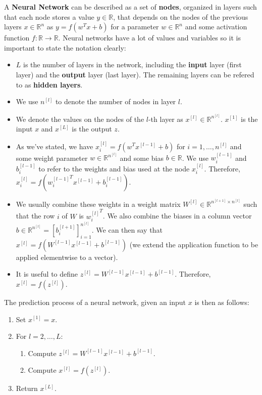 \documentclass{article}
\newcommand{\R}{\mathbb{R}}
\begin{document}
A \textbf{Neural Network} can be described as a set of \textbf{nodes}, organized in layers such that each node stores a value $y \in \R$, that depends on the nodes of the previous layers $x \in \R^n$ as $y = f(w^T x + b)$ for a parameter $w \in \R^n$ and some activation function $f: \R \to \R$.
Neural networks have a lot of values and variables so it is important to state the notation clearly:
\begin{itemize}
\item $L$ is the number of layers in the network, including the \textbf{input} layer (first layer) and the \textbf{output} layer (last layer). The remaining layers can be refered to as \textbf{hidden layers}.
\item We use $n^{[l]}$ to denote the number of nodes in layer $l$.
\item We denote the values on the nodes of the $l$-th layer as $x^{[l]} \in \R^{n^{[l]}}$. $x^{[1]}$ is the input $x$ and $x^{[L]}$ is the output $z$. 
\item As we've stated, we have $x^{[l]}_i = f(w^T x^{[l-1]} + b)$ for $i = 1, \dots, n^{[l]}$ and some weight parameter $w \in \R^{n^{[l]}}$ and some bias $b \in \R$. We use $w^{[l-1]}_i$ and $b^{[l-1]}_i$ to refer to the weights and bias used at the node $x^{[l]}_i$. Therefore, $x^{[l]}_i = f({w^{[l-1]}_i}^T x^{[l-1]} + b^{[l-1]}_i)$. 
\item We usually combine these weights in a weight matrix $W^{[l]} \in \R^{n^{[l+1]} \times n^{[l]}}$ such that the row $i$ of $W$ is ${w^{[l]}_i}^T$. We also combine the biases in a column vector $b \in \R^{n^{[l]}} = [b^{[l+1]}_i]_{i=1}^{n^{[l]}}$. We can then say that $x^{[l]} = f(W^{[l-1]}x^{[l-1]} + b^{[l-1]})$ (we extend the application function to be applied elementwise to a vector).
\item It is useful to define $z^{[l]} = W^{[l-1]}x^{[l-1]} + b^{[l-1]}$. Therefore, $x^{[l]} = f(z^{[l]})$.
\end{itemize}

The prediction process of a neural network, given an input $x$ is then as follows:
\begin{enumerate}
\item Set $x^{[1]} = x$.
\item For $l = 2, \dots, L$:
\begin{enumerate}
\item Compute $z^{[l]} = W^{[l-1]}x^{[l-1]} + b^{[l-1]}$.
\item Compute $x^{[l]} = f(z^{[l]})$.
\end{enumerate}
\item Return $x^{[L]}$.
\end{enumerate}
\end{document}
